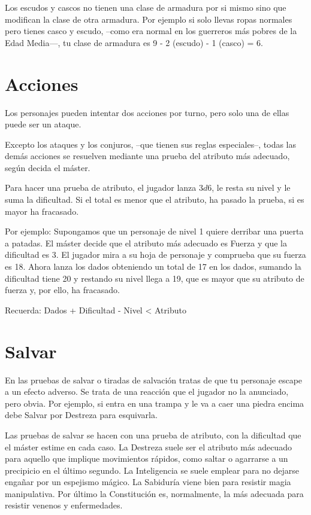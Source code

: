 \begin{multicols}{2}
\begin{table*}[p]
\begin{threeparttable}
\begin{tablenotes}
\item Los escudos y cascos no tienen una clase de armadura por si mismo sino que
modifican la clase de otra armadura. Por ejemplo si solo llevas ropas normales
pero tienes casco y escudo, --como era normal en los guerreros más pobres de la
Edad Media---, tu clase de armadura es 9 - 2 (escudo) - 1 (casco) = 6.

\end{tablenotes}
\end{threeparttable}
\end{table*}


\section{Acciones}

Los personajes pueden intentar dos acciones por turno, pero solo una de ellas
puede ser un ataque.

Excepto los ataques y los conjuros, --que tienen sus reglas especiales--, todas
las demás acciones se resuelven mediante una prueba del atributo más adecuado,
según decida el máster.

Para hacer una prueba de atributo, el jugador lanza $3d6$, le resta su nivel y le
suma la dificultad. Si el total es menor que el atributo, ha pasado la
prueba, si es mayor ha fracasado.

Por ejemplo: Supongamos que un personaje de nivel 1 quiere derribar una puerta a
patadas. El máster decide que el atributo más adecuado es Fuerza y que la
dificultad es 3. El jugador mira a su hoja de personaje y comprueba que su fuerza
es 18. Ahora lanza los dados obteniendo un total de 17 en los dados, sumando la
dificultad tiene 20 y restando su nivel llega a 19, que es mayor que su atributo
de fuerza y, por ello, ha fracasado.

Recuerda: Dados + Dificultad - Nivel < Atributo


\section{Salvar}

En las pruebas de salvar o tiradas de salvación tratas de que tu personaje
escape a un efecto adverso. Se trata de una reacción que el jugador no la anunciado,
pero obvia. Por ejemplo, si entra en una trampa y le va a caer una piedra encima
debe Salvar por Destreza para esquivarla.

Las pruebas de salvar se hacen con una prueba de atributo, con la dificultad que
el máster estime en cada caso. La Destreza suele ser el atributo más adecuado para
aquello que implique movimientos rápidos, como saltar o agarrarse a un precipicio
en el último segundo. La Inteligencia se suele emplear para no dejarse engañar por
un espejismo mágico. La Sabiduría viene bien para resistir magia manipulativa. Por
último la Constitución es, normalmente, la más adecuada para resistir venenos y
enfermedades.


\end{multicols}
